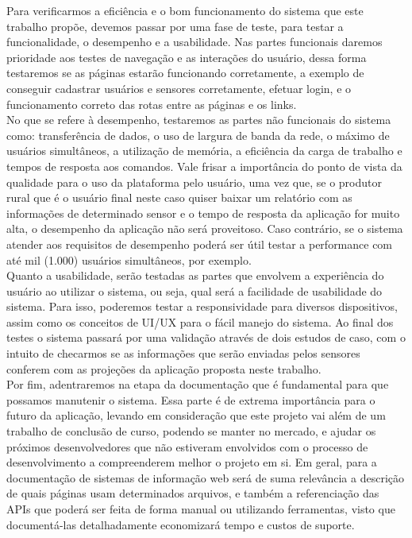 \documentclass[tcc-proposta]{texufpel}
\begin{document}
Para verificarmos a eficiência e o bom funcionamento do sistema que este trabalho propõe, devemos passar por uma fase de teste, para testar a funcionalidade, o desempenho e a usabilidade. Nas partes funcionais daremos prioridade aos testes de navegação e as interações do usuário, dessa forma testaremos se as páginas estarão funcionando corretamente, a exemplo de conseguir cadastrar usuários e sensores corretamente, efetuar login, e o funcionamento correto das rotas entre as páginas e os links. 
\\

No que se refere à desempenho, testaremos as partes não funcionais do sistema como: transferência de dados, o uso de largura de banda da rede, o máximo de usuários simultâneos, a utilização de memória, a eficiência da carga de trabalho e tempos de resposta aos comandos. Vale frisar a importância do ponto de vista da qualidade para o uso da plataforma pelo usuário, uma vez que, se o produtor rural que é o usuário final neste caso quiser baixar um relatório com as informações de determinado sensor e o tempo de resposta da aplicação for muito alta, o desempenho da aplicação não será proveitoso. Caso contrário, se o sistema atender aos requisitos de desempenho poderá ser útil testar a performance com até mil (1.000) usuários simultâneos, por exemplo.
\\

Quanto a usabilidade, serão testadas as partes que envolvem a experiência do usuário ao utilizar o sistema, ou seja, qual será a facilidade de usabilidade do sistema. Para isso, poderemos testar a responsividade para diversos dispositivos, assim como os conceitos de UI/UX para o fácil manejo do sistema. Ao final dos testes o sistema passará por uma validação através de dois estudos de caso, com o intuito de checarmos se as informações que serão enviadas pelos sensores conferem com as projeções da aplicação proposta neste trabalho.
\\

Por fim, adentraremos na etapa da documentação que é fundamental para que possamos manutenir o sistema. Essa parte é de extrema importância para o futuro da aplicação, levando em consideração que este projeto vai além de um trabalho de conclusão de curso, podendo se manter no mercado, e ajudar os próximos desenvolvedores que não estiveram envolvidos com o processo de desenvolvimento a compreenderem melhor o projeto em si. Em geral, para a documentação de sistemas de informação web será de suma relevância a descrição de quais páginas usam determinados arquivos, e também a referenciação das APIs que poderá ser feita de forma manual ou utilizando ferramentas, visto que documentá-las detalhadamente economizará tempo e custos de suporte.
\end{document}
